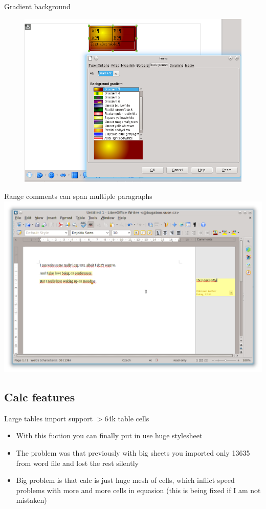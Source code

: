 \documentclass{beamer}
\begin{document}
\begin{frame}{Gradient background}
	\begin{figure}
	\includegraphics[width= 0.8\linewidth]{gradientbg-writer.png}
	\end{figure}
\end{frame}

\begin{frame}{Range comments can span multiple paragraphs}
	\includegraphics[width= 1.0\linewidth]{rangecomments-writer.png}
\end{frame}

\subsection{Calc features}

\begin{frame}[t]{Large tables import support $>$64k table cells}
	\begin{itemize}
	\item With this fuction you can finally put in use huge stylesheet
	\item The problem was that previously with big sheets you imported only 13635 from word file and lost the rest silently
	\item Big problem is that calc is just huge mesh of cells, which inflict speed problems with more and more cells in equasion (this is being fixed if I am not mistaken)
	\end{itemize}
\end{frame}
\end{document}
